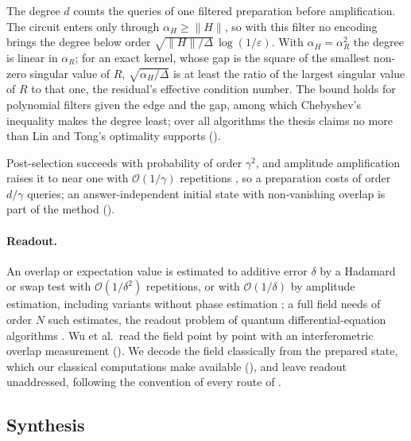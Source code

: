 The degree $d$ counts the queries of one filtered preparation before amplification. The circuit enters only through $\alpha_H\ge\|H\|$, so with this filter no encoding brings the degree below order $\sqrt{\|H\|/\Delta}\,\log(1/\varepsilon)$. With $\alpha_H=\alpha_R^2$ the degree is linear in $\alpha_R$; for an exact kernel, whose gap is the square of the smallest non-zero singular value of $R$, $\sqrt{\alpha_H/\Delta}$ is at least the ratio of the largest singular value of $R$ to that one, the residual's effective condition number. The bound holds for polynomial filters given the edge and the gap, among which Chebyshev's inequality makes the degree least; over all algorithms the thesis claims no more than Lin and Tong's optimality supports ().

Post-selection succeeds with probability of order $\gamma^2$, and amplitude amplification raises it to near one with $\mathcal O(1/\gamma)$ repetitions \cite{brassard2000amplitude}, so a preparation costs of order $d/\gamma$ queries; an answer-independent initial state with non-vanishing overlap is part of the method ().

\paragraph{Readout.} An overlap or expectation value is estimated to additive error $\delta$ by a Hadamard or swap test with $\mathcal O(1/\delta^2)$ repetitions, or with $\mathcal O(1/\delta)$ by amplitude estimation, including variants without phase estimation \cite{brassard2000amplitude,suzuki2020amplitude,grinko2021iterative}; a full field needs of order $N$ such estimates, the readout problem of quantum differential-equation algorithms \cite{williams2024readout,nishi2025overlap}. Wu et al.\ read the field point by point with an interferometric overlap measurement (). We decode the field classically from the prepared state, which our classical computations make available (), and leave readout unaddressed, following the convention of every route of .

\subsection{Synthesis}
\label{sec:bg-synthesis}

